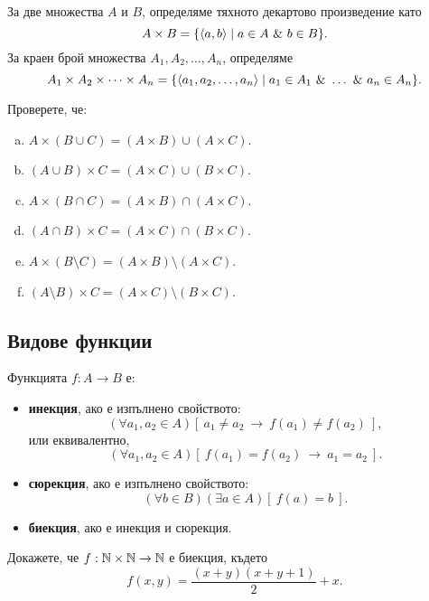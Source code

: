 За две множества $A$ и $B$, определяме тяхното декартово произведение като
\[A\times B = \{\langle{a,b}\rangle\mid a\in A\ \&\ b\in B\}.\]
За краен брой множества $A_1,A_2,\dots,A_n$, определяме
\[A_1\times A_2\times\cdots\times A_n = \{\pair{a_1,a_2,\dots,a_n}\mid a_1 \in A_1\ \&\ \dots\ \&\ a_n \in A_n\}.\]

\begin{problem}
  Проверете, че:
  \begin{enumerate}[a)]
  \item
    $A\times(B\cup C) = (A\times B) \cup (A\times C)$.
  \item
    $(A\cup B)\times C = (A\times C)\cup (B\times C)$.
  \item 
    $A\times(B\cap C) = (A\times B) \cap (A\times C)$.
  \item
    $(A \cap B)\times C = (A \times C)\cap(B\times C)$.
  \item 
    $A\times(B\setminus C) = (A\times B) \setminus (A\times C)$.
  \item
    $(A\setminus B)\times C = (A\times C)\setminus (B\times C)$.
  \end{enumerate}
\end{problem}


\subsection*{Видове функции}

Функцията $f:A \to B$ е:
\begin{itemize}
\item
  {\bf инекция}, ако е изпълнено свойството:
  \[(\forall a_1,a_2\in A)[\ a_1\neq a_2\ \to\ f(a_1)\neq f(a_2)\ ],\]
  или еквивалентно,
  \[(\forall a_1,a_2\in A)[\ f(a_1) = f(a_2)\ \to\ a_1 = a_2\ ].\]
\item
  {\bf сюрекция}, ако е изпълнено свойството:
  \[(\forall b\in B)(\exists a\in A)[\ f(a) = b\ ].\]
\item
  {\bf биекция}, ако е инекция и сюрекция.
\end{itemize}

\begin{problem}
  Докажете, че $f: \mathbb{N} \times \mathbb{N}\rightarrow \mathbb{N}$ е биекция, където
  \[f(x, y) = \frac{(x+y)(x+y+1)}{2} + x.\]
\end{problem}



